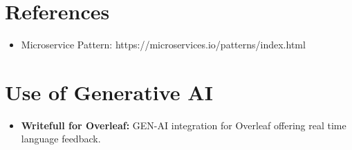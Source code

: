 \documentclass{Configuration_Files/PoliMi3i_thesis}
\begin{document}
\chapter{References}
\begin{itemize}
    \item Microservice Pattern: https://microservices.io/patterns/index.html
\end{itemize}

\chapter{Use of Generative AI}
\begin{itemize}
    \item \textbf{Writefull for Overleaf:} GEN-AI integration for Overleaf offering real time language feedback.
\end{itemize}




\cleardoublepage
\end{document}
